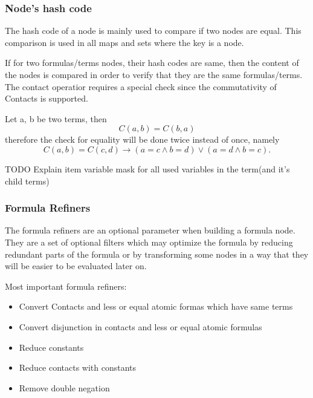 \documentclass{article}
\begin{document}
		\subsubsection*{Node's hash code}
			The hash code of a node is mainly used to compare if two nodes are equal. 
			This comparison is used in all maps and sets where the key is a node. 
			
			If for two formulas/terms nodes, their hash codes are same, then the content of the nodes is 
			compared in order to verify that they are the same formulas/terms.
			\newline
			The contact operatior requires a special check since the commutativity of Contacts is supported.
			\newline

			Let a, b be two terms, then
			\begin{equation}
				C(a, b) = C(b, a)
			\end{equation}
			therefore the check for equality will be done twice instead of once, namely
			\begin{equation}
				 C(a, b) = C(c, d) \rightarrow (a = c \wedge b = d) \vee (a = d \wedge b = c).
			\end{equation}
		

		TODO Explain item variable mask for all used variables in the term(and it's child terms)

		\subsubsection{Formula Refiners}
			The formula refiners are an optional parameter when building a formula node.
			They are a set of optional filters which may optimize the formula by reducing redundant parts of the 
			formula or by transforming some nodes in a way that they will be easier to be evaluated later on.
			
			Most important formula refiners:
			\begin{itemize}
				\item Convert Contacts and less or equal atomic formas which have same terms
				\item Convert disjunction in contacts and less or equal atomic formulas
				\item Reduce constants
				\item Reduce contacts with constants
				\item Remove double negation
			\end{itemize}
\end{document}

